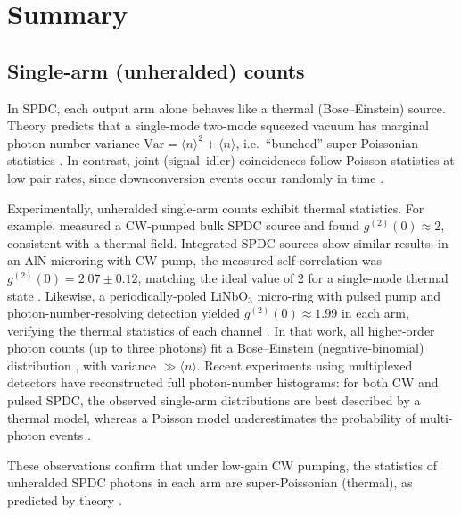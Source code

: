
\section{Summary}

\subsection*{Single-arm (unheralded) counts}
In SPDC, each output arm alone behaves like a thermal (Bose--Einstein) source. Theory predicts that a single-mode two-mode squeezed vacuum has marginal photon-number variance 
$\mathrm{Var}=\langle n\rangle^2+\langle n\rangle$, i.e.\ ``bunched'' super-Poissonian statistics \citep{Christ2011}. In contrast, joint (signal--idler) coincidences follow Poisson statistics at low pair rates, since downconversion events occur randomly in time \citep{Avenhaus2008,Christ2011}.

Experimentally, unheralded single-arm counts exhibit thermal statistics. For example, \citet{Blauensteiner2009} measured a CW-pumped bulk SPDC source and found $g^{(2)}(0)\approx2$, consistent with a thermal field. Integrated SPDC sources show similar results: in an AlN microring with CW pump, the measured self-correlation was $g^{(2)}(0)=2.07\pm0.12$, matching the ideal value of 2 for a single-mode thermal state \citep{Guo2017}. Likewise, a periodically-poled LiNbO$_3$ micro-ring with pulsed pump and photon-number-resolving detection yielded $g^{(2)}(0)\approx1.99$ in each arm, verifying the thermal statistics of each channel \citep{Fang2023}. In that work, all higher-order photon counts (up to three photons) fit a Bose--Einstein (negative-binomial) distribution \citep{Christ2011,Fang2023}, with variance $\gg \langle n\rangle$. Recent experiments using multiplexed detectors have reconstructed full photon-number histograms: for both CW and pulsed SPDC, the observed single-arm distributions are best described by a thermal model, whereas a Poisson model underestimates the probability of multi-photon events \citep{Christ2011}.

These observations confirm that under low-gain CW pumping, the statistics of unheralded SPDC photons in each arm are super-Poissonian (thermal), as predicted by theory \citep{Avenhaus2008,Christ2011}.

